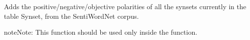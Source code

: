 \documentclass[letterpaper,10pt,english]{sphinxmanual}
\begin{document}
\begin{fulllineitems}
\label{\detokenize{process:loacore.process.synset_process.add_polarity_to_synsets}}
Adds the positive/negative/objective polarities of all the synsets currently in the table
Synset, from the SentiWordNet corpus.

\begin{sphinxadmonition}{note}{Note:}
This function should be used only inside the  function.
\end{sphinxadmonition}

\end{fulllineitems}

\end{document}
